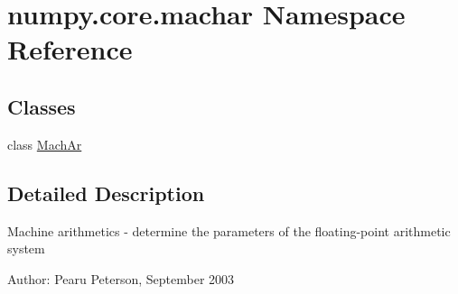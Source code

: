 \hypertarget{namespacenumpy_1_1core_1_1machar}{}\section{numpy.\+core.\+machar Namespace Reference}
\label{namespacenumpy_1_1core_1_1machar}
\subsection*{Classes}
\begin{DoxyCompactItemize}
\item 
class \hyperlink{classnumpy_1_1core_1_1machar_1_1MachAr}{Mach\+Ar}
\end{DoxyCompactItemize}


\subsection{Detailed Description}
\begin{DoxyVerb}Machine arithmetics - determine the parameters of the
floating-point arithmetic system

Author: Pearu Peterson, September 2003\end{DoxyVerb}
 